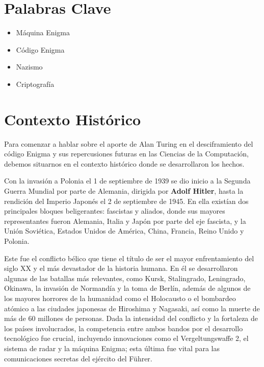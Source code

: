 \documentclass{article}
\begin{document}
\pagebreak %

\section*{Palabras Clave}
\begin{itemize}
    \item Máquina Enigma
    \item Código Enigma
    \item  Nazismo
    \item Criptografía
\end{itemize}

\pagebreak %
\section*{Contexto Histórico}

Para comenzar a hablar sobre el aporte de Alan Turing en el desciframiento del 
código Enigma y sus repercusiones futuras en las Ciencias de la Computación, 
debemos situarnos en el contexto histórico donde se desarrollaron los hechos.

Con la invasión a Polonia el 1 de septiembre de 1939 se dio inicio a la Segunda 
Guerra Mundial por parte de Alemania, dirigida por \textbf{Adolf Hitler}, hasta 
la rendición del Imperio Japonés el 2 de septiembre de 1945\cite{Wikipedia:WorldWarIIWiki}. 
En ella existían dos principales bloques beligerantes: fascistas y aliados, donde sus mayores 
representantes fueron Alemania, Italia y Japón por parte del eje fascista, y la Unión Soviética, 
Estados Unidos de América, China, Francia, Reino Unido y Polonia.

Este fue el conflicto bélico que tiene el título de ser el mayor enfrentamiento del siglo XX y 
el más devastador de la historia humana. En él se desarrollaron algunas de las batallas más relevantes,
 como Kursk, Stalingrado, Leningrado, Okinawa, la invasión de Normandía y la toma de Berlín, 
 además de algunos de los mayores horrores de la humanidad como el Holocausto o el bombardeo 
 atómico a las ciudades japonesas de Hiroshima y Nagasaki, así como la muerte de más de 60 
 millones de personas\cite{Wikipedia:WorldWarIIWiki}. Dada la intensidad del conflicto y la 
 fortaleza de los países involucrados, la competencia entre ambos bandos por el desarrollo 
 tecnológico fue crucial, incluyendo innovaciones como el Vergeltungswaffe 2\cite{Wikipedia:V2}, el sistema de 
 radar y la máquina Enigma; esta última fue vital para las comunicaciones secretas del ejército del Führer.
\end{document}
